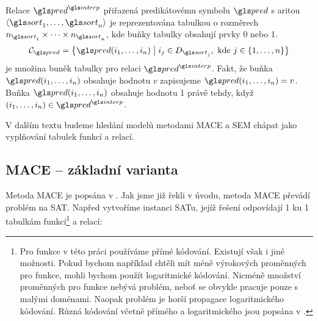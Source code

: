 Relace $\pred^\interp$
přiřazená predikátovému symbolu $\pred$ s aritou
$\langle \sort_1 \comdots \sort_n \rangle$
je reprezentována tabulkou o rozměrech $n_{\sort_1} \timdots n_{\sort_n}$,
kde buňky tabulky obsahují prvky 0 nebo 1.
\[
\cells_\pred = \bigl\{ \pred(i_1 \comdots i_n) \bigm| i_j \in D_{\sort_j},
  \text{ kde } j \in \{ 1 \comdots n  \}  \bigr\}
\]
je množina buněk tabulky pro relaci $\pred^\interp$.
Fakt, že buňka $\pred(i_1 \comdots i_n)$ obsahuje hodnotu $v$
zapisujeme $\pred(i_1 \comdots i_n) = v$.
Buňka $\pred(i_1 \comdots i_n)$ obsahuje hodnotu 1
právě tehdy, když $(i_1 \comdots i_n) \in \pred^\interp$.


V dalším textu budeme hledání modelů metodami MACE a SEM chápat jako
vyplňování tabulek funkcí a relací.

\subsection{MACE -- základní varianta} \label{sec:mace-basic}

Metoda MACE je popsána v \cite{mccune94davis-putnam}.
Jak jsme již řekli v úvodu, metoda MACE převádí problém na SAT.
Napřed vytvoříme instanci SATu, jejíž řešení odpovídají 1 ku 1
tabulkám funkcí\footnote{Pro funkce v této práci používáme přímé kódování.
Existují však i jiné možnosti.
Pokud bychom například chtěli mít méně
výrokových proměnných pro funkce, mohli bychom použít logaritmické kódování.
Nicméně množství proměnných pro funkce nebývá problém,
neboť se obvykle pracuje pouze s malými doménami.
Naopak problém je horší propagace logaritmického kódování.
Různá kódování včetně přímého a logaritmického jsou popsána
v \cite{gavanelli2007}.} a relací:


